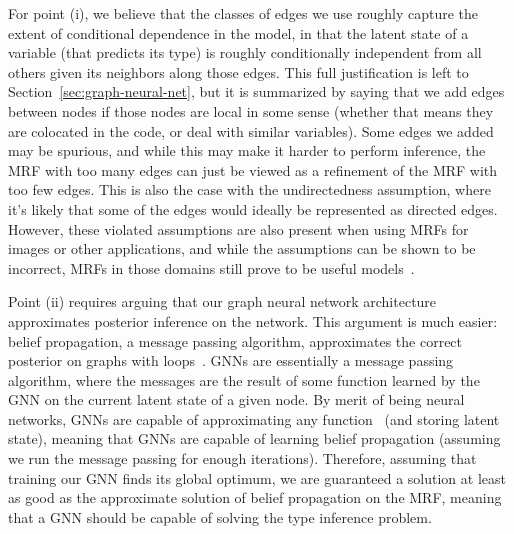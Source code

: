 For point (i), we believe that the classes of edges we use roughly capture the extent of conditional dependence in the model, in that the latent state of a variable (that predicts its type) is roughly conditionally independent from all others given its neighbors along those edges.
This full justification is left to Section~\ref{sec:graph-neural-net}, but it is summarized by saying that we add edges between nodes if those nodes are local in some sense (whether that means they are colocated in the code, or deal with similar variables).
Some edges we added may be spurious, and while this may make it harder to perform inference, the MRF with too many edges can just be viewed as a refinement of the MRF with too few edges.
This is also the case with the undirectedness assumption, where it's likely that some of the edges would ideally be represented as directed edges.
However, these violated assumptions are also present when using MRFs for images or other applications, and while the assumptions can be shown to be incorrect, MRFs in those domains still prove to be useful models~\cite{rangarajan95markov}.

Point (ii) requires arguing that our graph neural network architecture approximates posterior inference on the network.
This argument is much easier: belief propagation, a message passing algorithm, approximates the correct posterior on graphs with loops~\cite{weiss2000correctness}.
GNNs are essentially a message passing algorithm, where the messages are the result of some function learned by the GNN on the current latent state of a given node.
By merit of being neural networks, GNNs are capable of approximating any function~\cite{hornik1989multilayer} (and storing latent state), meaning that GNNs are capable of learning belief propagation (assuming we run the message passing for enough iterations).
Therefore, assuming that training our GNN finds its global optimum, we are guaranteed a solution at least as good as the approximate solution of belief propagation on the MRF, meaning that a GNN should be capable of solving the type inference problem.

